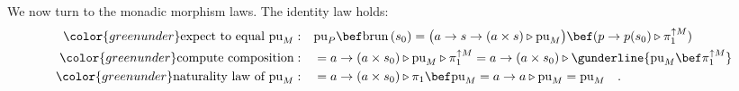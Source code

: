 We now turn to the monadic morphism laws. The identity law holds:
\begin{align*}
{\color{greenunder}\text{expect to equal }\text{pu}_{M}:}\quad & \text{pu}_{P}\bef\text{brun}\,(s_{0})=\big(a\rightarrow s\rightarrow(a\times s)\triangleright\text{pu}_{M}\big)\bef(p\rightarrow p(s_{0})\triangleright\pi_{1}^{\uparrow M})\\
{\color{greenunder}\text{compute composition}:}\quad & =a\rightarrow(a\times s_{0})\triangleright\text{pu}_{M}\triangleright\pi_{1}^{\uparrow M}=a\rightarrow(a\times s_{0})\triangleright\gunderline{\text{pu}_{M}\bef\pi_{1}^{\uparrow M}}\\
{\color{greenunder}\text{naturality law of }\text{pu}_{M}:}\quad & =a\rightarrow(a\times s_{0})\triangleright\pi_{1}\bef\text{pu}_{M}=a\rightarrow a\triangleright\text{pu}_{M}=\text{pu}_{M}\quad.
\end{align*}

